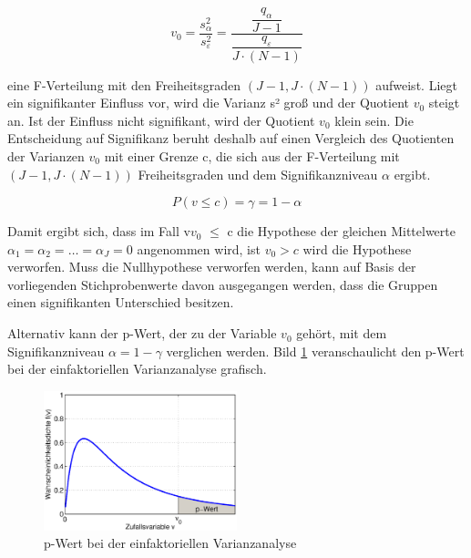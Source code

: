 \begin{equation}\label{eq:ninesixteen}
v_{0} =\dfrac{s_{\alpha}^{2}}{s_{\varepsilon }^{2}} =\dfrac{\dfrac{q_{\alpha}}{J-1}}{\dfrac{q_{\varepsilon}}{J\cdot (N-1)}}
\end{equation}

\noindent eine F-Verteilung mit den Freiheitsgraden $(J - 1, J\cdot (N - 1))$ aufweist. Liegt ein signifikanter Einfluss vor, wird die Varianz s² gro{\ss} und der Quotient $v_{0}$ steigt an. Ist der Einfluss nicht signifikant, wird der Quotient $v_{0}$ klein sein. Die Entscheidung auf Signifikanz beruht deshalb auf einen Vergleich des Quotienten der Varianzen $v_{0}$ mit einer Grenze c, die sich aus der F-Verteilung mit $(J - 1, J\cdot (N - 1))$ Freiheitsgraden und dem Signifikanzniveau $\alpha$ ergibt. 

\begin{equation}\label{eq:nineseventeen}
P(v\le c)=\gamma =1-\alpha
\end{equation}

\noindent Damit ergibt sich, dass im Fall v$v_{0}$ $\leq$ c die Hypothese der gleichen Mittelwerte $\alpha_{1} = \alpha_{2} = \dots = \alpha_{J} = 0$ angenommen wird, ist $v_{0} > c$ wird die Hypothese verworfen. Muss die Nullhypothese verworfen werden, kann auf Basis der vorliegenden Stichprobenwerte davon ausgegangen werden, dass die Gruppen einen signifikanten Unterschied besitzen. \newline

\noindent Alternativ kann der p-Wert, der zu der Variable $v_{0}$ geh\"{o}rt, mit dem Signifikanzniveau $\alpha = 1 - \gamma$ verglichen werden. Bild \ref{fig:FVerteilungSignifikanz} veranschaulicht den p-Wert bei der einfaktoriellen Varianzanalyse grafisch.

\noindent 
\begin{figure}[H]
  \centerline{\includegraphics[width=0.5\textwidth]{Kapitel9/Bilder/image2}}
  \caption{p-Wert bei der einfaktoriellen Varianzanalyse}
  \label{fig:FVerteilungSignifikanz}
\end{figure}

